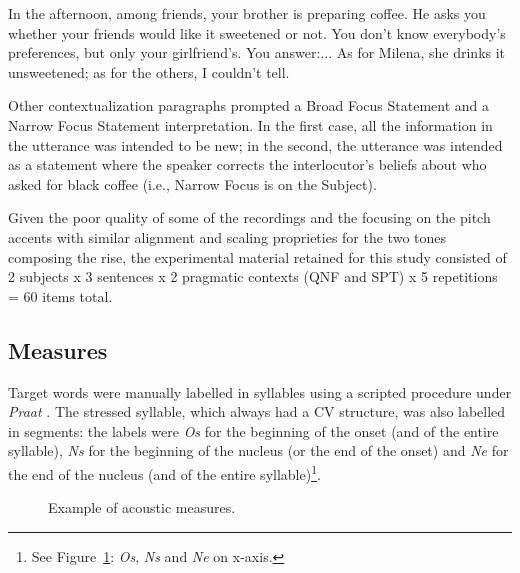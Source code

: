 \eal
\ex In the afternoon, among friends, your brother is preparing coffee. He asks you whether your friends would like it sweetened or not. You don’t know everybody’s preferences, but only your girlfriend’s. You answer:...
\ex As for Milena, she drinks it unsweetened; as for the others, I couldn't tell.
\zl

Other contextualization paragraphs prompted a Broad Focus Statement and a Narrow Focus Statement interpretation. In the first case, all the information in the utterance was intended to be new; in the second, the utterance was intended as a statement where the speaker corrects the interlocutor's beliefs about who asked for black coffee (i.e., Narrow Focus is on the Subject).

Given the poor quality of some of the recordings and the focusing on the pitch accents with similar alignment and scaling proprieties for the two tones composing the rise, the experimental material retained for this study consisted of 2 subjects x 3 sentences x 2 pragmatic contexts (QNF and SPT) x 5 repetitions = 60 items total.

\subsection{Measures}\label{sec222}
Target words were manually labelled in syllables using a scripted procedure under \textit{Praat} \citep{boersma2008praat}. The stressed syllable, which always had a CV structure, was also labelled in segments: the labels were \textit{Os} for the beginning of the onset (and of the entire syllable), \textit{Ns} for the beginning of the nucleus (or the end of the onset) and \textit{Ne} for the end of the nucleus (and of the entire syllable)\footnote{See Figure~\ref{fig203}: \textit{Os}, \textit{Ns} and \textit{Ne} on x-axis.}.

\begin{figure}
\centering
{}
\caption{Example of acoustic measures.}
\label{fig203}\end{figure}

